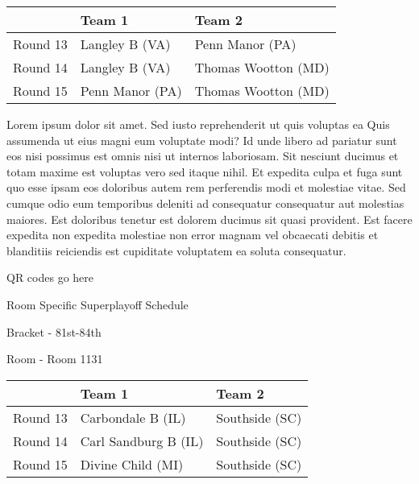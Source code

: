 \documentclass{article}%
\begin{document}
%
\begin{tabularx}{\textwidth}{|c|Y|Y|}%
\hline%
&Team 1&Team 2\\%
\hline%
Round 13&Langley B (VA)&Penn Manor (PA)\\%
Round 14&Langley B (VA)&Thomas Wootton (MD)\\%
Round 15&Penn Manor (PA)&Thomas Wootton (MD)\\%
\hline%
\end{tabularx}%
\vspace*{8pt}%
\newline%
Lorem ipsum dolor sit amet. Sed iusto reprehenderit ut quis voluptas ea Quis assumenda ut eius magni eum voluptate modi? Id unde libero ad pariatur sunt eos nisi possimus est omnis nisi ut internos laboriosam. Sit nesciunt ducimus et totam maxime est voluptas vero sed itaque nihil. Et expedita culpa et fuga sunt quo esse ipsam eos doloribus autem rem perferendis modi et molestiae vitae.\newline%
\newline%
Sed cumque odio eum temporibus deleniti ad consequatur consequatur aut molestias maiores. Est doloribus tenetur est dolorem ducimus sit quasi provident. Est facere expedita non expedita molestiae non error magnam vel obcaecati debitis et blanditiis reiciendis est cupiditate voluptatem ea soluta consequatur.%
\vspace*{140pt}%
\begin{center}%
\begin{Huge}%
QR codes go here%
\end{Huge}%
\end{center}%
\newpage%
\begin{center}%
\begin{Huge}%
Room Specific Superplayoff Schedule%
\end{Huge}%
\vspace*{8pt}%
\linebreak%
\begin{Large}%
Bracket {-} 81st{-}84th%
\end{Large}%
\vspace*{8pt}%
\linebreak%
\vspace*{8pt}%
\begin{Large}%
Room {-} Room 1131%
\end{Large}%
\end{center}%
%
\begin{tabularx}{\textwidth}{|c|Y|Y|}%
\hline%
&Team 1&Team 2\\%
\hline%
Round 13&Carbondale B (IL)&Southside (SC)\\%
Round 14&Carl Sandburg B (IL)&Southside (SC)\\%
Round 15&Divine Child (MI)&Southside (SC)\\%
\hline%
\end{tabularx}%
\end{document}
